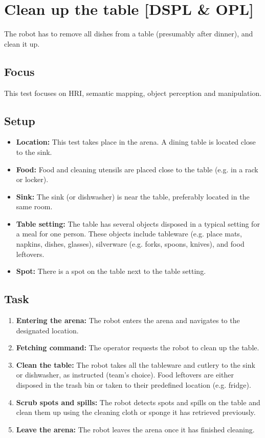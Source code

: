 \section{Clean up the table [DSPL \& OPL]}
The robot has to remove all dishes from a table (presumably after dinner), and clean it up.

\subsection{Focus}
This test focuses on HRI, semantic mapping, object perception and manipulation.

\subsection{Setup}
\begin{itemize}
	\item \textbf{Location:} This test takes place in the arena. A dining table is located close to the sink.
	\item \textbf{Food:} Food and cleaning utensils are placed close to the table (e.g. in a rack or locker).
	\item \textbf{Sink:} The sink (or dishwasher) is near the table, preferably located in the same room.
	\item \textbf{Table setting:} The table has several objects disposed in a typical setting for a meal for one person. These objects include tableware (e.g. place mats, napkins, dishes, glasses), silverware (e.g. forks, spoons, knives), and food leftovers.
	\item \textbf{Spot:} There is a spot on the table next to the table setting.
\end{itemize}

\subsection{Task}
	\begin{enumerate}
		\item \textbf{Entering the arena:} The robot enters the arena and navigates to the designated location.
		\item \textbf{Fetching command:} The operator requests the robot to clean up the table.
		\item \textbf{Clean the table:} The robot takes all the tableware and cutlery to the sink or dishwasher, as instructed (team's choice). Food leftovers are either disposed in the trash bin or taken to their predefined location (e.g. fridge).
		\item \textbf{Scrub spots and spills:} The robot detects spots and spills on the table and clean them up using the cleaning cloth or sponge it has retrieved previously.
		\item \textbf{Leave the arena:} The robot leaves the arena once it has finished cleaning.
	\end{enumerate}

